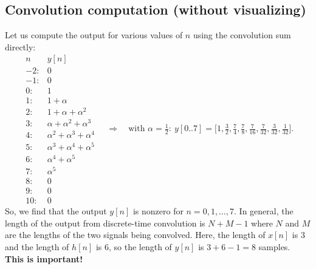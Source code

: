 {%
}


\subsection{Convolution computation (without visualizing)}

Let us compute the output for various values of $n$ using the convolution sum directly:
\[
\begin{array}{c|l}
n & y[n] \\ \hline
-2: & 0\\
-1: & 0\\
0: & 1\\
1: & 1+\alpha\\
2: & 1+\alpha+\alpha^2\\
3: & \alpha+\alpha^2+\alpha^3\\
4: & \alpha^2+\alpha^3+\alpha^4\\
5: & \alpha^3+\alpha^4+\alpha^5\\
6: & \alpha^4+\alpha^5\\
7: & \alpha^5\\
8: & 0\\
9: & 0\\
10: & 0
\end{array}
\quad\Rightarrow\quad
\text{with }\alpha=\tfrac12:\ 
y[0..7]=\Big[1,\tfrac32,\tfrac74,\tfrac78,\tfrac7{16},\tfrac7{32},\tfrac3{32},\tfrac1{32}\Big].
\]
So, we find that the output $y[n]$ is nonzero for $n=0,1,\ldots,7$. In general, the length of the output from discrete-time convolution is $N+M-1$ where $N$ and $M$ are the lengths of the two signals being convolved. Here, the length of $x[n]$ is $3$ and the length of $h[n]$ is $6$, so the length of $y[n]$ is $3+6-1=8$ samples. \textbf{This is important!}
